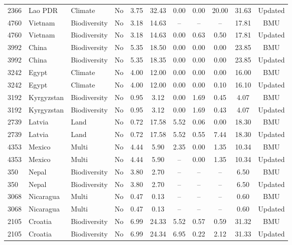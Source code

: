 \documentclass{article}
\begin{document}
\begin{singlespace}
\begin{table}[H]
{\begin{tabular}{lllcccccccc}
			\rowcolor[HTML]{EFEFEF} 
			2366 & Lao PDR & Climate & No & 3.75 & 32.43 & 0.00 & 0.00 & 20.00 & 31.63 & Updated \\
			4760 & Vietnam & Biodiversity & No & 3.18 & 14.63 & -- & -- & -- & 17.81 & BMU \\
			\rowcolor[HTML]{EFEFEF} 
			4760 & Vietnam & Biodiversity & No & 3.18 & 14.63 & 0.00 & 0.63 & 0.50 & 17.81 & Updated \\
			3992 & China & Biodiversity & No & 5.35 & 18.50 & 0.00 & 0.00 & 0.00 & 23.85 & BMU \\
			\rowcolor[HTML]{EFEFEF} 
			3992 & China & Biodiversity & No & 5.35 & 18.35 & 0.00 & 0.00 & 0.00 & 23.85 & Updated \\
			3242 & Egypt & Climate & No & 4.00 & 12.00 & 0.00 & 0.00 & 0.00 & 16.00 & BMU \\
			\rowcolor[HTML]{EFEFEF} 
			3242 & Egypt & Climate & No & 4.00 & 12.00 & 0.00 & 0.00 & 0.10 & 16.10 & Updated \\
			3192 & Kyrgyzstan & Biodiversity & No & 0.95 & 3.12 & 0.00 & 1.69 & 0.45 & 4.07 & BMU \\
			\rowcolor[HTML]{EFEFEF} 
			3192 & Kyrgyzstan & Biodiversity & No & 0.95 & 3.12 & 0.00 & 1.69 & 0.43 & 4.07 & Updated \\
			2739 & Latvia & Land & No & 0.72 & 17.58 & 5.52 & 0.06 & 0.00 & 18.30 & BMU \\
			\rowcolor[HTML]{EFEFEF} 
			2739 & Latvia & Land & No & 0.72 & 17.58 & 5.52 & 0.55 & 7.44 & 18.30 & Updated \\
			4353 & Mexico & Multi & No & 4.44 & 5.90 & 2.35 & 0.00 & 1.35 & 10.34 & BMU \\
			\rowcolor[HTML]{EFEFEF} 
			4353 & Mexico & Multi & No & 4.44 & 5.90 & -- & 0.00 & 1.35 & 10.34 & Updated \\
			350 & Nepal & Biodiversity & No & 3.80 & 2.70 & -- & -- & -- & 6.50 & BMU \\
			\rowcolor[HTML]{EFEFEF} 
			350 & Nepal & Biodiversity & No & 3.80 & 2.70 & -- & -- & -- & 6.50 & Updated \\
			3068 & Nicaragua & Multi & No & 0.47 & 0.13 & -- & -- & -- & 0.60 & BMU \\
			\rowcolor[HTML]{EFEFEF} 
			3068 & Nicaragua & Multi & No & 0.47 & 0.13 & -- & -- & -- & 0.60 & Updated \\
			2105 & Croatia & Biodiversity & No & 6.99 & 24.33 & 5.52 & 0.57 & 0.59 & 31.32 & BMU \\
			\rowcolor[HTML]{EFEFEF} 
			2105 & Croatia & Biodiversity & No & 6.99 & 24.34 & 6.95 & 0.22 & 2.12 & 31.33 & Updated \\

\end{tabular}}
\end{table}
\end{singlespace}
\end{document}
